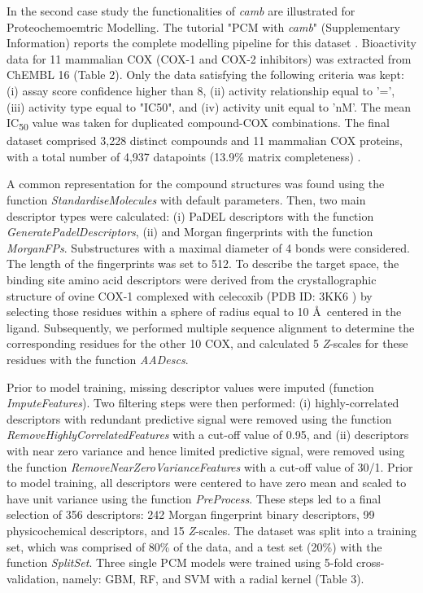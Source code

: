 \documentclass[twoside,a4wide,10pt]{article}
\begin{document}
In the second case study the functionalities of {\it camb} are illustrated for Proteochemoemtric Modelling.
The tutorial "PCM with {\it camb}" (Supplementary Information) reports the complete modelling pipeline for this dataset \cite{cortesCOX}. 
Bioactivity data for 11 mammalian COX (COX-1 and COX-2 inhibitors) was extracted from ChEMBL 16 \citep{chembl, cortesCOX} (Table 2).
Only the data satisfying the following criteria was kept:
(i) assay score confidence higher than 8,
(ii) activity relationship equal to '=',
(iii) activity type equal to "IC50",
and (iv) activity unit equal to 'nM'.
The mean IC\textsubscript{50} value was taken for duplicated compound-COX combinations.
The final dataset comprised 3,228 distinct compounds and 11 mammalian COX proteins,  
with a total number of 4,937 datapoints (13.9\% matrix completeness) \citep{cortesCOX}.

A common representation for the compound structures was found using the function 
{\it StandardiseMolecules} with default parameters.
Then, two main descriptor types were calculated: (i) PaDEL descriptors \citep{padel} with the function {\it GeneratePadelDescriptors},
(ii) and Morgan fingerprints with the function {\it MorganFPs}.
Substructures with a maximal diameter of 4 bonds were considered.
The length of the fingerprints was set to 512.
To describe the target space, the binding site amino acid descriptors were derived
from the crystallographic structure of ovine COX-1 complexed with celecoxib (PDB ID: 3KK6 \citep{pdb_cox})
by selecting those residues within a sphere of radius equal to 10 \AA \ centered in the ligand.
Subsequently, we performed multiple sequence alignment to determine the corresponding 
residues for the other 10 COX, and calculated 5 {\it Z}-scales for these residues with the function {\it AADescs}. 

Prior to model training, missing descriptor values were imputed (function {\it ImputeFeatures}).
Two filtering steps were then performed: (i) highly-correlated descriptors with redundant predictive signal were removed using the function 
{\it RemoveHighlyCorrelatedFeatures} with a cut-off value of 0.95, and (ii) descriptors with near zero variance
and hence limited predictive signal, were removed using the function {\it RemoveNearZeroVarianceFeatures} with a cut-off value of 30/1.
Prior to model training, all descriptors were centered to have zero mean and scaled to have unit variance using the function {\it PreProcess}.
These steps led to a final selection of 356 descriptors: 242 Morgan fingerprint binary descriptors, 
99 physicochemical descriptors, and 15 {\it Z}-scales.
The dataset was split into a training set, which was comprised of 80\% of the data, and a test set (20\%) with the function {\it SplitSet}.
Three single PCM models were trained using 5-fold cross-validation, namely: GBM, RF, and SVM with a radial kernel (Table 3).
\end{document}
